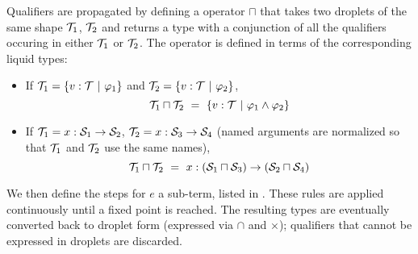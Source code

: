 Qualifiers are propagated by defining a  operator $\sqcap$ that
takes two droplets of the same shape $\mathcal{T}_1$, $\mathcal{T}_2$ and returns a type with a conjunction of all the qualifiers
occuring in either $\mathcal{T}_1$ or $\mathcal{T}_2$. The operator is defined in terms of the corresponding liquid types:
\begin{itemize}
  \item If $\mathcal{T}_1=\{v:\mathcal{T} ~|~ \varphi_1\}$ and $\mathcal{T}_2=\{v:\mathcal{T} ~|~ \varphi_2\}$,
	\[\mathcal{T}_1\sqcap\mathcal{T}_2 ~=~ \{v:\mathcal{T} ~|~ \varphi_1\land\varphi_2\}\]
  \item If $\mathcal{T}_1=x:\mathcal{S}_1\to\mathcal{S}_2$, $\mathcal{T}_2=x:\mathcal{S}_3\to\mathcal{S}_4$ (named arguments are normalized so that $\mathcal{T}_1$ and $\mathcal{T}_2$ use the same names),
    \[\mathcal{T}_1\sqcap\mathcal{T}_2 ~=~ x:(\mathcal{S}_1\sqcap\mathcal{S}_3)\to(\mathcal{S}_2\sqcap\mathcal{S}_4)\]
\end{itemize}

We then define the  steps for $e$ a sub-term, listed in .
These rules are applied continuously until a fixed point is reached.
The resulting types are eventually converted back to droplet form (expressed via $\cap$ and $\times$);
qualifiers that cannot be expressed in droplets are discarded.

